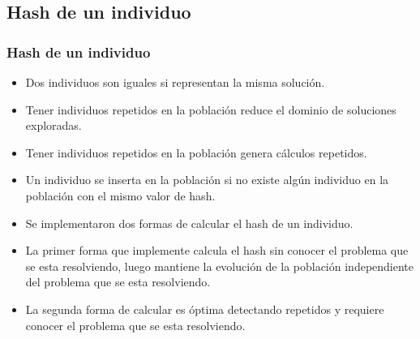 \documentclass{beamer}
\begin{document}

\subsection{Hash de un individuo}

\begin{frame}
\frametitle{Hash de un individuo}

\begin{itemize}
    \item Dos individuos son iguales si representan la misma solución.
    \item Tener individuos repetidos en la población reduce el dominio de soluciones exploradas.
    \item Tener individuos repetidos en la población genera cálculos repetidos.
    \pause
    \item Un individuo se inserta en la población si no existe algún individuo en la población con el mismo valor de hash.
    \pause
    \item Se implementaron dos formas de calcular el hash de un individuo.
    \item La primer forma que implemente calcula el hash sin conocer el problema que se esta resolviendo, luego mantiene la evolución de la población independiente del problema que se esta resolviendo.
    \item La segunda forma de calcular es óptima detectando repetidos y requiere conocer el problema que se esta resolviendo.
\end{itemize}

\end{frame}

\end{document}
